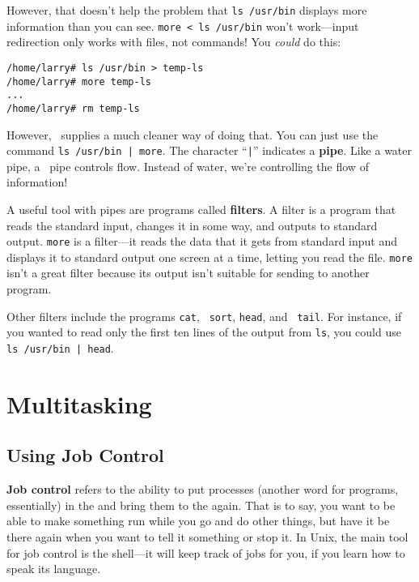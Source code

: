 However, that doesn't help the problem that {\tt ls /usr/bin} displays more
information than you can see. {\tt more < ls /usr/bin} won't work---input
redirection only works with files, not commands! You {\em could\/} do this:

\begin{screen}\begin{verbatim}
/home/larry# ls /usr/bin > temp-ls
/home/larry# more temp-ls
...
/home/larry# rm temp-ls
\end{verbatim}\end{screen}

However, \unix\ supplies a much cleaner way of doing that. You can just use
the command {\tt ls /usr/bin | more}. The character ``{\tt |}'' indicates a
{\bf pipe}. Like a water pipe, a \unix\ pipe controls flow. Instead of
water, we're controlling the flow of information!

A useful tool with pipes are programs called {\bf
  filters}.  A filter is a program that reads the
standard input, changes it in some way, and outputs to standard
output. {\tt more} is a filter---it reads the data that it gets from
standard input and displays it to standard output one screen at a
time, letting you read the file.  {\tt more} isn't a great filter
because its output isn't suitable for sending to another program.

Other filters include the programs {\tt cat}, {\tt
sort}, {\tt head}, and {\tt
tail}. For instance, if you wanted to read only the first ten
lines of the output from {\tt ls}, you could use {\tt ls /usr/bin | head}.


\section{Multitasking}\label{section-multitasking}

\subsection{Using Job Control}

{\bf Job control} refers to the ability to
put processes (another word for programs, essentially) in the
 and bring them to the  again.
That is to say, you want to be able to make something run while you go
and do other things, but have it be there again when you want to tell
it something or stop it.  In Unix, the main tool for job control is
the shell---it will keep track of jobs for you, if you learn how to
speak its language.

